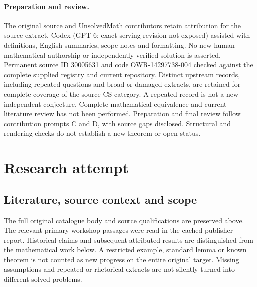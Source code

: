 \documentclass[11pt]{article}
\begin{document}
\paragraph{Preparation and review.}
The original source and UnsolvedMath contributors retain attribution for the source extract. Codex (GPT-6; exact serving revision not exposed) assisted with definitions, English summaries, scope notes and formatting. No new human mathematical authorship or independently verified solution is asserted. Permanent source ID 30005631 and code OWR-14297738-004 checked against the complete supplied registry and current repository. Distinct upstream records, including repeated questions and broad or damaged extracts, are retained for complete coverage of the source CS category. A repeated record is not a new independent conjecture. Complete mathematical-equivalence and current-literature review has not been performed. Preparation and final review follow contribution prompts C and D, with source gaps disclosed. Structural and rendering checks do not establish a new theorem or open status.
\label{end:30005631}

\section{Research attempt}
\subsection{Literature, source context and scope}
The full original catalogue body and source qualifications are preserved above. The relevant primary workshop passages were read in the cached publisher report. Historical claims and subsequent attributed results are distinguished from the mathematical work below. A restricted example, standard lemma or known theorem is not counted as new progress on the entire original target. Missing assumptions and repeated or rhetorical extracts are not silently turned into different solved problems.
\end{document}

